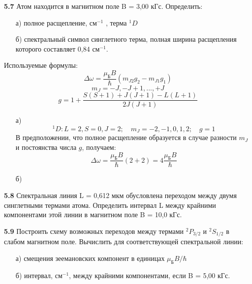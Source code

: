 	\textbf{5.7 }
		Атом находится в магнитном поле B = 3,00 кГс. Определить: 
		\vspace*{-1em}
		\begin{itemize}\itemsep-8pt
			\item[а)] полное расщепление, \( \text{см}^{-1} \) , терма \( ^1D \) 
			\item[б)] спектральный символ синглетного терма,
			полная ширина расщепления которого составляет 0,84 \( \text{см}^{-1} \).
		\end{itemize}
		Используемые формулы: 
		\[ \Delta\omega = \frac{\mu_\text{Б}B}{\hbar}(m_{J2}g_{2}-m_{J1}g_{1}) \]
		\[ m_J = -J, -J+1, ..., +J \]
		\[ g = 1 + \frac{S(S+1)+J(J+1)-L(L+1)}{2J(J+1)} \]
		\begin{itemize}\itemsep-8pt
			\item[а)] 
			\[ 
				^1D: L=2, S=0, J=2;\quad
				m_J = -2, -1, 0, 1, 2;\quad
				g = 1
			\]
			В предположении, что полное расщепление образуется в случае разности
			\( m_J \) и постоянства числа \( g \), получаем:
			\[ 
				\Delta\omega = \frac{\mu_\text{Б}B}{\hbar}(2+2) 
				= 4\frac{\mu_\text{Б}B}{\hbar} 
			\]
			\item[б)]
		\end{itemize}

	\textbf{5.8 }
		Спектральная линия L = 0,612 мкм обусловлена переходом между двумя
		синглетными термами атома. Определить интервал L между крайними
		компонентами этой линии в магнитном поле B = 10,0 кГс.

	\textbf{5.9 }
		Построить схему возможных переходов между термами \( ^2P_{3/2} \) и 
		\( ^2S_{1/2} \) в слабом магнитном поле. Вычислить для соответствующей 
		спектральной линии:
		\vspace*{-2em}
		\begin{itemize}\itemsep-8pt
			\item[а)] смещения зеемановских компонент в единицах 
			\( \mu_\text{Б}B/\hbar \)
			\item[б)] интервал, \( \text{см}^{-1} \), между крайними 
			компонентами, если B = 5,00 кГс.
		\end{itemize}

